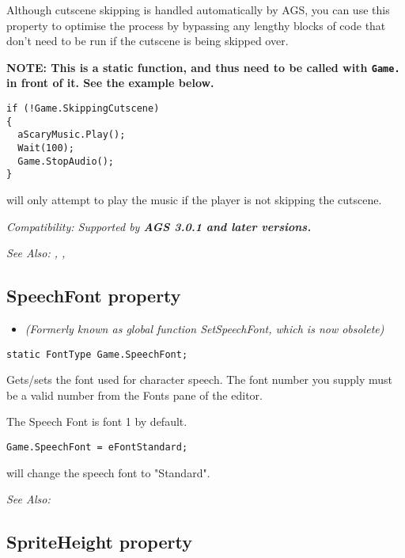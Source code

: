 Although cutscene skipping is handled automatically by AGS, you can use this property to optimise
the process by bypassing any lengthy blocks of code that don't need to be run if the cutscene is
being skipped over.

\bf{NOTE:} This is a static function, and thus need to be called with \verb$Game.$ in front of it. See
the example below.

\begin{verbatim}
if (!Game.SkippingCutscene)
{
  aScaryMusic.Play();
  Wait(100);
  Game.StopAudio();
}
\end{verbatim}
will only attempt to play the music if the player is not skipping the cutscene.

\it{Compatibility:} Supported by \bf{AGS 3.0.1} and later versions.

\it{See Also:} , ,


\subsection{SpeechFont property}\label{Game.SpeechFont}%

\begin{itemize}
\item \it{(Formerly known as global function SetSpeechFont, which is now obsolete)}
\end{itemize}

\begin{verbatim}
static FontType Game.SpeechFont;
\end{verbatim}
Gets/sets the font used for character speech. The font number you
supply must be a valid number from the Fonts pane of the editor.

The Speech Font is font 1 by default.

\begin{verbatim}
Game.SpeechFont = eFontStandard;
\end{verbatim}
will change the speech font to "Standard".

\it{See Also:} 


\subsection{SpriteHeight property}\label{Game.SpriteHeight}%

